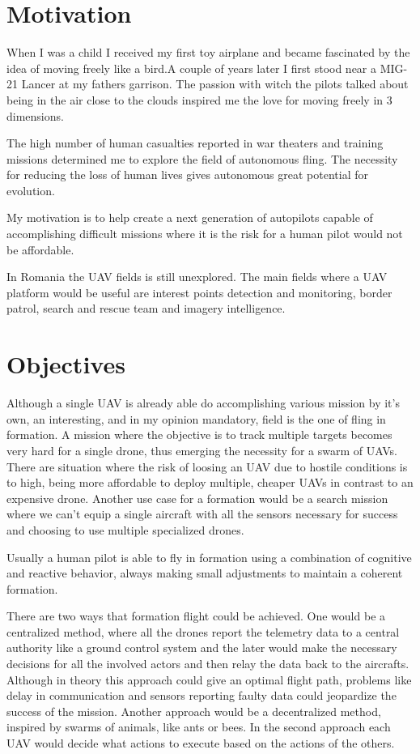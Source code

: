 \section{Motivation}
\label{sec:motivation}
When I was a child I received my first toy airplane and became fascinated
by the idea of moving freely like a bird.A couple of years later I first stood 
near a MIG-21 Lancer at my fathers garrison. The passion with witch the pilots 
talked about being in the air close to the clouds inspired me the love for moving 
freely in 3 dimensions.

The high number of human casualties reported in war theaters and training missions
determined me to explore the field of autonomous fling. The necessity for reducing
the loss of human lives gives autonomous great potential for evolution.

My motivation is to help create a next generation of autopilots capable of 
accomplishing difficult missions where it is the risk for a human pilot would 
not be affordable.

In Romania the UAV fields is still unexplored. The main fields where a UAV
platform would be useful are interest points detection and monitoring, border
patrol, search and rescue team and imagery intelligence.

\section{Objectives}
\label{sec:objectives}

Although a single UAV is already able do accomplishing various mission by it's
own, an interesting, and in my opinion mandatory,  field is the one of fling in
formation. A mission where the objective is to track multiple targets becomes
very hard for a single drone, thus emerging the necessity for a swarm of UAVs.
There are situation where the risk of loosing an UAV due to hostile conditions
is to high, being more affordable to deploy multiple,  cheaper UAVs in contrast
to an expensive drone. Another use case for a formation would be a search mission
where we can't equip a single aircraft with all the sensors necessary for success
and choosing to use multiple specialized drones.

Usually a human pilot is able to fly in formation using a combination of
cognitive and reactive behavior,  always making small adjustments to maintain a
coherent formation.

There are two ways that formation flight could be achieved. One would be a 
centralized method,  where all the drones report the telemetry data to a central
authority like a ground control system and the later would make the necessary 
decisions for all the involved actors and then relay the data back to the aircrafts.
Although in theory this approach could give an optimal flight path,  problems
like delay in communication and sensors reporting faulty data could jeopardize
the success of the mission. Another approach would be a decentralized method, 
inspired by swarms of animals, like ants or bees. In the second approach each 
UAV would decide what actions to execute based on the actions of the others.

